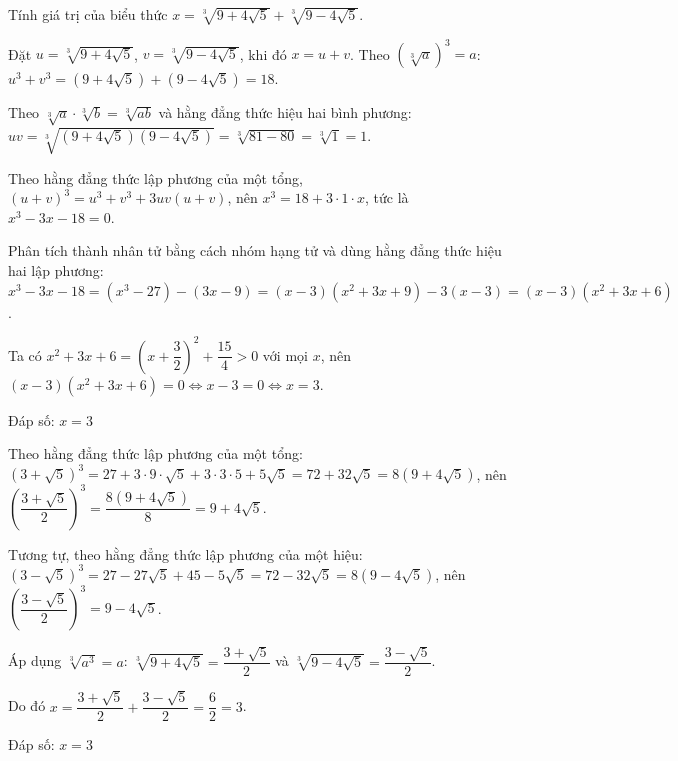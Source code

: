 \begin{problem}[9DS-CAN-019]
Tính giá trị của biểu thức $x = \sqrt[3]{9 + 4\sqrt{5}} + \sqrt[3]{9 - 4\sqrt{5}}$.

\begin{solution}
Đặt $u = \sqrt[3]{9 + 4\sqrt{5}}$, $v = \sqrt[3]{9 - 4\sqrt{5}}$, khi đó $x = u + v$. Theo $\left(\sqrt[3]{a}\right)^3 = a$: $u^3 + v^3 = (9 + 4\sqrt{5}) + (9 - 4\sqrt{5}) = 18$.

Theo $\sqrt[3]{a} \cdot \sqrt[3]{b} = \sqrt[3]{ab}$ và hằng đẳng thức hiệu hai bình phương: $uv = \sqrt[3]{(9 + 4\sqrt{5})(9 - 4\sqrt{5})} = \sqrt[3]{81 - 80} = \sqrt[3]{1} = 1$.

Theo hằng đẳng thức lập phương của một tổng, $(u + v)^3 = u^3 + v^3 + 3uv(u + v)$, nên $x^3 = 18 + 3 \cdot 1 \cdot x$, tức là $x^3 - 3x - 18 = 0$.

Phân tích thành nhân tử bằng cách nhóm hạng tử và dùng hằng đẳng thức hiệu hai lập phương: $x^3 - 3x - 18 = (x^3 - 27) - (3x - 9) = (x - 3)(x^2 + 3x + 9) - 3(x - 3) = (x - 3)(x^2 + 3x + 6)$.

Ta có $x^2 + 3x + 6 = \left(x + \dfrac{3}{2}\right)^2 + \dfrac{15}{4} > 0$ với mọi $x$, nên $(x - 3)(x^2 + 3x + 6) = 0 \Leftrightarrow x - 3 = 0 \Leftrightarrow x = 3$.

Đáp số: $\boxed{x = 3}$
\end{solution}

\begin{solution}
Theo hằng đẳng thức lập phương của một tổng: $(3 + \sqrt{5})^3 = 27 + 3 \cdot 9 \cdot \sqrt{5} + 3 \cdot 3 \cdot 5 + 5\sqrt{5} = 72 + 32\sqrt{5} = 8(9 + 4\sqrt{5})$, nên $\left(\dfrac{3 + \sqrt{5}}{2}\right)^3 = \dfrac{8(9 + 4\sqrt{5})}{8} = 9 + 4\sqrt{5}$.

Tương tự, theo hằng đẳng thức lập phương của một hiệu: $(3 - \sqrt{5})^3 = 27 - 27\sqrt{5} + 45 - 5\sqrt{5} = 72 - 32\sqrt{5} = 8(9 - 4\sqrt{5})$, nên $\left(\dfrac{3 - \sqrt{5}}{2}\right)^3 = 9 - 4\sqrt{5}$.

Áp dụng $\sqrt[3]{a^3} = a$: $\sqrt[3]{9 + 4\sqrt{5}} = \dfrac{3 + \sqrt{5}}{2}$ và $\sqrt[3]{9 - 4\sqrt{5}} = \dfrac{3 - \sqrt{5}}{2}$.

Do đó $x = \dfrac{3 + \sqrt{5}}{2} + \dfrac{3 - \sqrt{5}}{2} = \dfrac{6}{2} = 3$.

Đáp số: $\boxed{x = 3}$
\end{solution}
\end{problem}

